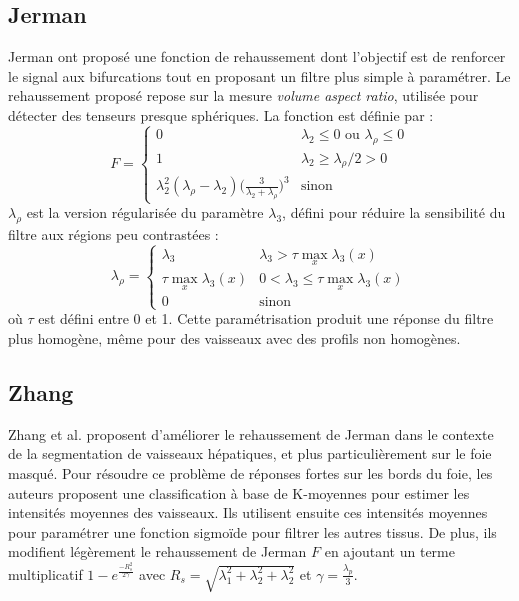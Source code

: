 \subsection{Jerman}

Jerman \etal ont proposé une fonction de rehaussement dont l'objectif est de renforcer le signal aux bifurcations tout en proposant un filtre plus simple à paramétrer. Le rehaussement proposé repose sur la mesure \textit{volume aspect ratio}, utilisée pour détecter des tenseurs presque sphériques. La fonction est définie par :
\begin{equation}
\nonumber
  F =
\left\{
  \begin{array}{lr}
    0 & \lambda_2 \leqslant 0 \textrm{~ou~} \lambda_\rho \leqslant 0 \\
    1 & \lambda_2 \geqslant \lambda_\rho / 2 > 0 \\
    \lambda_2^2(\lambda_\rho -\lambda_2)\big(\frac{3}{\lambda_2+\lambda_\rho}\big)^3 & \textrm{sinon}
  \end{array}
  \right. 
\end{equation}
$\lambda_\rho$ est la version régularisée du paramètre $\lambda_3$, défini pour réduire la sensibilité du filtre aux régions peu contrastées :
\begin{equation}
\nonumber
  \lambda_\rho =
  \left\{
  \begin{array}{lr}
     \lambda_3  & \lambda_3 > \tau \max_{x} \lambda_3(x) \\
    \tau \max_{x} \lambda_3(x) & 0 < \lambda_3 \leqslant \tau \max_{x} \lambda_3(x) \\
    0  & \textrm{sinon}
  \end{array}
\right.
\end{equation}
où $\tau$ est défini entre 0 et 1. Cette paramétrisation produit une réponse du filtre plus homogène, même pour des vaisseaux avec des profils non homogènes.

\subsection{Zhang}

Zhang et al. proposent d'améliorer le rehaussement de Jerman dans le contexte de la segmentation de vaisseaux hépatiques, et plus particulièrement sur le foie masqué. Pour résoudre ce problème de réponses fortes sur les bords du foie, les auteurs proposent une classification à base de K-moyennes pour estimer les intensités moyennes des vaisseaux. Ils utilisent ensuite ces intensités moyennes pour paramétrer une fonction sigmoïde pour filtrer les autres tissus. De plus, ils modifient légèrement le rehaussement de Jerman $F$ en ajoutant un terme multiplicatif $1-e^{ \frac{-R^2_s}{2 \gamma}}$ avec $R_s = \sqrt{\lambda^2_1 + \lambda^2_2 + \lambda^2_2}$ et $\gamma= \frac{\lambda_p}{3}$.


